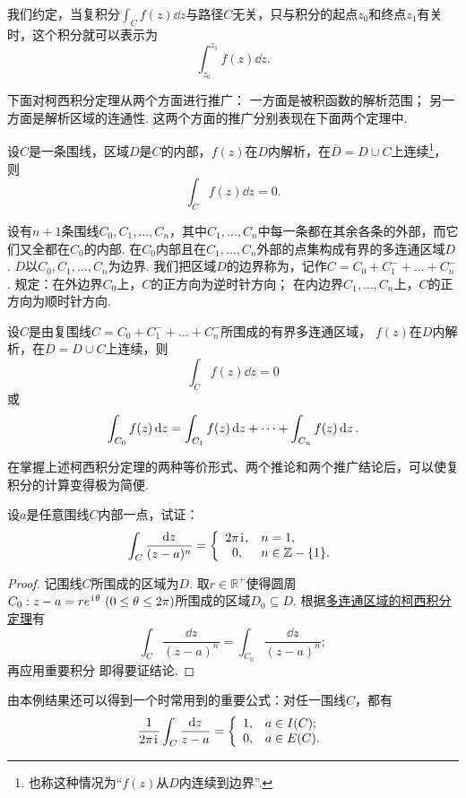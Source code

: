 我们约定，当复积分\(\int_C f(z) \dd{z}\)与路径\(C\)无关，只与积分的起点\(z_0\)和终点\(z_1\)有关时，这个积分就可以表示为\[
\int_{z_0}^{z_1} f(z) \dd{z}.
\]

下面对柯西积分定理从两个方面进行推广：
一方面是被积函数的解析范围；
另一方面是解析区域的连通性.
这两个方面的推广分别表现在下面两个定理中.
\begin{theorem}
设\(C\)是一条围线，区域\(D\)是\(C\)的内部，\(f(z)\)在\(D\)内解析，在\(\overline{D}=D \cup C\)上连续\footnote{%
也称这种情况为“\(f(z)\)从\(D\)内连续到边界”.%
}，则\[
\int_C f(z) \dd{z} = 0.
\]
\end{theorem}

\begin{definition}
设有\(n+1\)条围线\(C_0,C_1,\dots,C_n\)，其中\(C_1,\dots,C_n\)中每一条都在其余各条的外部，而它们又全都在\(C_0\)的内部.
在\(C_0\)内部且在\(C_1,\dots,C_n\)外部的点集构成有界的多连通区域\(D\).
\(D\)以\(C_0,C_1,\dots,C_n\)为边界.
我们把区域\(D\)的边界称为，记作\(C=C_0+C_1^-+\dots+C_n^-\).
规定：在外边界\(C_0\)上，\(C\)的正方向为逆时针方向；
在内边界\(C_1,\dots,C_n\)上，\(C\)的正方向为顺时针方向.
\end{definition}

\begin{theorem}[多连通区域的柯西积分定理]\label{theorem:解析函数的积分表示.多连通区域的柯西积分定理}
设\(C\)是由复围线\(C=C_0+C_1^-+\dots+C_n^-\)所围成的有界多连通区域，
\(f(z)\)在\(D\)内解析，在\(\overline{D}=D \cup C\)上连续，则\[
\int_C f(z) \dd{z} = 0
\]或\begin{equation}
\def\Ic#1{\int_{C_{#1}} f(z) \dd{z}}
\Ic{0} = \Ic{1} + \dots + \Ic{n}.
\end{equation}
\end{theorem}

在掌握上述柯西积分定理的两种等价形式、两个推论和两个推广结论后，可以使复积分的计算变得极为简便.

\begin{example}
设\(a\)是任意围线\(C\)内部一点，试证：\[
\int_C \frac{\dd{z}}{(z-a)^n} = \left\{ \begin{array}{cl}
2\pi\kern1pt\mathrm{i}\kern1pt, & n=1, \\
0, & n\in\mathbb{Z}-\{1\}.
\end{array} \right.
\]
\begin{proof}
记围线\(C\)所围成的区域为\(D\).
取\(r\in\mathbb{R}^+\)使得圆周\(C_0: z - a = r e^{\kern1pt\mathrm{i}\kern1pt\theta}\ (0 \leq \theta \leq 2\pi)\)所围成的区域\(D_0 \subseteq D\).
根据\hyperref[theorem:解析函数的积分表示.多连通区域的柯西积分定理]{多连通区域的柯西积分定理}有\[
\int_C \frac{\dd{z}}{(z-a)^n} = \int_{C_0} \frac{\dd{z}}{(z-a)^n};
\]再应用重要积分  即得要证结论.
\end{proof}
\end{example}
由本例结果还可以得到一个时常用到的重要公式：对任一围线\(C\)，都有\begin{equation}\label{equation.解析函数的积分表示.重要积分2}
\frac{1}{2\pi\kern1pt\mathrm{i}\kern1pt} \int_C \frac{\dd{z}}{z-a}
= \left\{ \begin{array}{ll}
1, & a \in I(C); \\
0, & a \in E(C).
\end{array} \right.
\end{equation}

